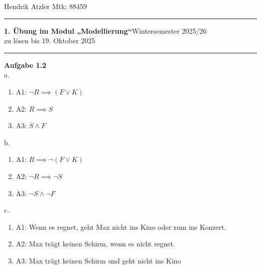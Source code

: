 \documentclass[a4paper,12pt]{article}
\begin{document}
Hendrik Atzler \hfill Mtk: 88459

\rule{\textwidth}{0.4pt}


{\textbf{1. Übung im Modul „Modellierung“}\hfill Wintersemester 2025/26} \\
zu lösen bis 19. Oktober 2025 \\
\rule{\textwidth}{0.4pt}

{\large{\textbf{Aufgabe 1.2}}} \\

a. \begin{enumerate}[{  }]
\item{A1: $ \neg R \implies (F \lor K) $}
\item{A2: $ R \implies S $}
\item{A3: $ S \land F $}
\end{enumerate}
b. \begin{enumerate}[{  }]
\item{A1: $ R \implies \neg (F \lor K) $}
\item{A2: $ \neg R \implies \neg S $}
\item{A3: $ \neg S \land \neg F $}
\end{enumerate}
c. \begin{enumerate}[{  }]
\item{A1: Wenn es regnet, geht Max nicht ins Kino oder zum ins Konzert.}
\item{A2: Max trägt keinen Schirm, wenn es nicht regnet.}
\item{A3: Max trägt keinen Schirm und geht nicht ins Kino}
\end{enumerate}
\end{document}

